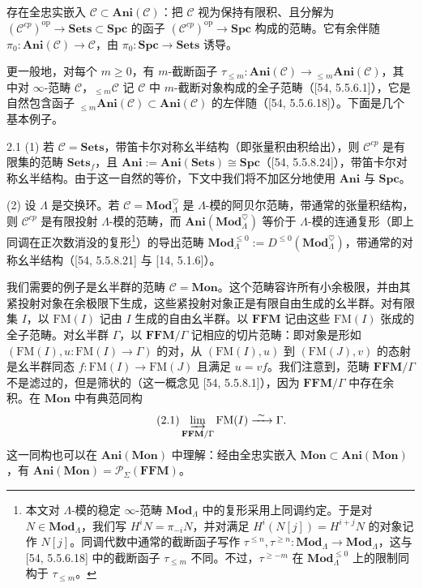 存在全忠实嵌入 $\mathcal C\subset\mathbf{Ani}(\mathcal C)$：把 $\mathcal C$ 视为保持有限积、且分解为 $(\mathcal C^{cp})^{\mathrm{op}}\to\mathbf{Sets}\subset\mathbf{Spc}$ 的函子 $(\mathcal C^{cp})^{\mathrm{op}}\to\mathbf{Spc}$ 构成的范畴。它有余伴随 $\pi_0:\mathbf{Ani}(\mathcal C)\to\mathcal C$，由 $\pi_0:\mathbf{Spc}\to\mathbf{Sets}$ 诱导。

更一般地，对每个 $m\ge 0$，有 $m$-截断函子 $\tau_{\le m}:\mathbf{Ani}(\mathcal C)\to{}_{\le m}\mathbf{Ani}(\mathcal C)$，其中对 $\infty$-范畴 $\mathcal C$，${}_{\le m}\mathcal C$ 记 $\mathcal C$ 中 $m$-截断对象构成的全子范畴（[54, 5.5.6.1]），它是自然包含函子 ${}_{\le m}\mathbf{Ani}(\mathcal C)\subset\mathbf{Ani}(\mathcal C)$ 的左伴随（[54, 5.5.6.18]）。下面是几个基本例子。

\begin{exam}{2.1}\label{exam:a2-2-1}
(1) 若 $\mathcal C=\mathbf{Sets}$，带笛卡尔对称幺半结构（即张量积由积给出），则 $\mathcal C^{cp}$ 是有限集的范畴 $\mathbf{Sets}_f$，且 $\mathbf{Ani}:=\mathbf{Ani}(\mathbf{Sets})\cong\mathbf{Spc}$（[54, 5.5.8.24]），带笛卡尔对称幺半结构。由于这一自然的等价，下文中我们将不加区分地使用 $\mathbf{Ani}$ 与 $\mathbf{Spc}$。

(2) 设 $\Lambda$ 是交换环。若 $\mathcal C=\mathbf{Mod}_\Lambda^\heartsuit$ 是 $\Lambda$-模的阿贝尔范畴，带通常的张量积结构，则 $\mathcal C^{cp}$ 是有限投射 $\Lambda$-模的范畴，而 $\mathbf{Ani}(\mathbf{Mod}_\Lambda^\heartsuit)$ 等价于 $\Lambda$-模的连通复形（即上同调在正次数消没的复形\footnote{本文对 $\Lambda$-模的稳定 $\infty$-范畴 $\mathbf{Mod}_\Lambda$ 中的复形采用上同调约定。于是对 $N\in\mathbf{Mod}_\Lambda$，我们写 $H^iN=\pi_{-i}N$，并对满足 $H^i(N[j])=H^{i+j}N$ 的对象记作 $N[j]$。同调代数中通常的截断函子写作 $\tau^{\le n},\tau^{\ge n}:\mathbf{Mod}_\Lambda\to\mathbf{Mod}_\Lambda$，这与 [54, 5.5.6.18] 中的截断函子 $\tau_{\le m}$ 不同。不过，$\tau^{\ge -m}$ 在 $\mathbf{Mod}_\Lambda^{\le 0}$ 上的限制同构于 $\tau_{\le m}$。}）的导出范畴 $\mathbf{Mod}_\Lambda^{\le 0}:=D^{\le 0}(\mathbf{Mod}_\Lambda^\heartsuit)$，带通常的对称幺半结构（[54, 5.5.8.21] 与 [14, 5.1.6]）。
\end{exam}

我们需要的例子是幺半群的范畴 $\mathcal C=\mathbf{Mon}$。这个范畴容许所有小余极限，并由其紧投射对象在余极限下生成，这些紧投射对象正是有限自由生成的幺半群。对有限集 $I$，以 $\mathrm{FM}(I)$ 记由 $I$ 生成的自由幺半群。以 $\mathbf{FFM}$ 记由这些 $\mathrm{FM}(I)$ 张成的全子范畴。对幺半群 $\Gamma$，以 $\mathbf{FFM}/\Gamma$ 记相应的切片范畴：即对象是形如 $(\mathrm{FM}(I),u:\mathrm{FM}(I)\to\Gamma)$ 的对，从 $(\mathrm{FM}(I),u)$ 到 $(\mathrm{FM}(J),v)$ 的态射是幺半群同态 $f:\mathrm{FM}(I)\to\mathrm{FM}(J)$ 且满足 $u=vf$。我们注意到，范畴 $\mathbf{FFM}/\Gamma$ 不是滤过的，但是筛状的（这一概念见 [54, 5.5.8.1]），因为 $\mathbf{FFM}/\Gamma$ 中存在余积。在 $\mathbf{Mon}$ 中有典范同构
\begin{equation}\tag{2.1}
\varinjlim_{\mathbf{FFM}/\Gamma}\mathrm{FM}(I)\xrightarrow{\ \sim\ }\Gamma .
\end{equation}
这一同构也可以在 $\mathbf{Ani}(\mathbf{Mon})$ 中理解：经由全忠实嵌入 $\mathbf{Mon}\subset\mathbf{Ani}(\mathbf{Mon})$，有 $\mathbf{Ani}(\mathbf{Mon})=\mathcal P_\Sigma(\mathbf{FFM})$。

